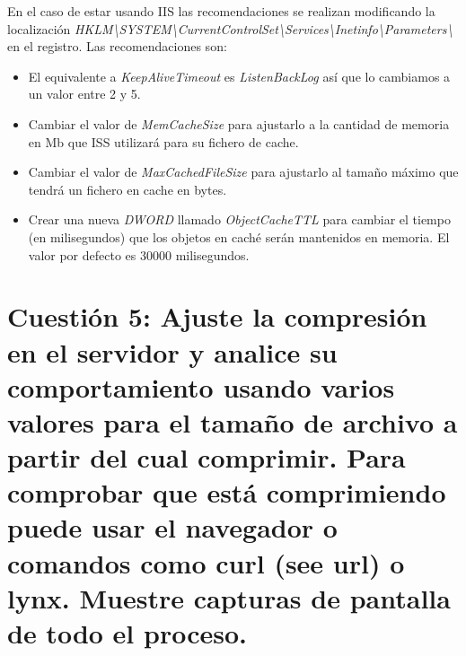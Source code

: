 \documentclass[a4paper,titlepage,12pt]{scrartcl}	%
\numberwithin{figure}{section} %
\numberwithin{table}{section} %
\begin{document}
	En el caso de estar usando IIS las recomendaciones se realizan modificando la localización \textit{HKLM\textbackslash SYSTEM\textbackslash CurrentControlSet\textbackslash Services\textbackslash Inetinfo\textbackslash Parameters\textbackslash} en el registro. Las recomendaciones son:
	\begin{itemize}
		\item El equivalente a \textit{KeepAliveTimeout} es \textit{ListenBackLog} así que lo cambiamos a un valor entre 2 y 5.
		\item Cambiar el valor de \textit{MemCacheSize} para ajustarlo a la cantidad de memoria en Mb que ISS utilizará para su fichero de cache.
		\item Cambiar el valor de \textit{MaxCachedFileSize} para ajustarlo al tamaño máximo que tendrá un fichero en cache en bytes.
		\item Crear una nueva \textit{DWORD} llamado \textit{ObjectCacheTTL} para cambiar el tiempo (en milisegundos) que los objetos en caché serán mantenidos en memoria. El valor por defecto es 30000 milisegundos.		
	\end{itemize}
	
	\section[Cuestión 5: Ajuste la compresión en el servidor y analice su comportamiento usando varios valores para el tamaño de archivo a partir del cual comprimir. Para comprobar que está comprimiendo puede usar el navegador o comandos como curl (see url) o lynx. Muestre capturas de pantalla de todo el proceso.]{Cuestión 5: Ajuste la compresión en el servidor y analice su comportamiento usando varios valores para el tamaño de archivo a partir del cual comprimir. Para comprobar que está comprimiendo puede usar el navegador o comandos como curl (see url) o lynx. Muestre capturas de pantalla de todo el proceso.}
	
\end{document}
